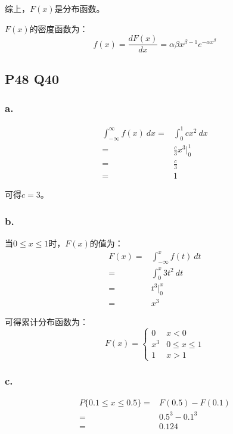 \documentclass[a4paper,12pt]{ctexart}
\begin{document}
综上，$F(x)$是分布函数。

$F(x)$的密度函数为：
\begin{equation*}
	f(x) = \frac{dF(x)}{dx} = \alpha \beta x^{\beta - 1} e^{-\alpha x^\beta}
\end{equation*}

\subsection*{P48 Q40}

\subsubsection*{a.}

\begin{align*}
	\int_{-\infty}^{\infty} f(x)\ dx =& \int_{0}^{1} cx^2\ dx\\
	=& \frac{c}{3} x^3 \Big|_0^1\\
	=& \frac{c}{3}\\
	=& 1
\end{align*}

可得$c = 3$。

\subsubsection*{b.}

当$0 \leq x \leq 1$时，$F(x)$的值为：
\begin{align*}
	F(x) =& \int_{-\infty}^{x} f(t)\ dt\\
	=& \int_{0}^{x} 3t^2\ dt\\
	=& t^3 \Big|_0^x\\
	=& x^3
\end{align*}

可得累计分布函数为：
\begin{equation*}
	F(x) = \begin{cases}
		0 & x < 0\\
		x^3 & 0 \leq x \leq 1\\
		1 & x > 1
	\end{cases}
\end{equation*}

\subsubsection*{c.}

\begin{align*}
	P\{0.1 \leq x \leq 0.5\} =& F(0.5) - F(0.1)\\
	=& 0.5^3 - 0.1^3\\
	=& 0.124
\end{align*}
\end{document}
